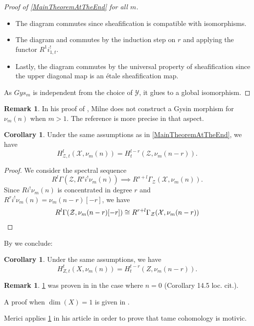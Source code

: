 \documentclass{amsart}
\theoremstyle{definition}
\newtheorem{remark}[theorem]{Remark}
\newtheorem{corollary}[theorem]{Corollary}
\newcommand{\lcirc}[1]{\scaleobj{.8}{\mbox{\Kr{#1}}}}
\numberwithin{equation}{section}
\begin{document}
\begin{proof}[Proof of \cref{MainTheoremAtTheEnd} for all $m$]
\begin{itemize}
	\item	The diagram \lcirc{{2}} commutes since sheafification is compatible with isomorphisms.
	\item The diagram and \lcirc{{3}} commutes by the induction step on $r$ and applying the functor $R^1i_{1,t}^!$.
	\item 	Lastly, the diagram \lcirc{{4}} commutes by the universal property of sheafification since the upper diagonal map is an \'etale sheafification map.
\end{itemize}    
As $Gys_m$ is independent from the choice of $\mathcal{Y}$, it glues to a global isomorphism.
\end{proof}
\begin{remark}
	In his proof of \cite[Proposition 2.1]{MilneValuesOfZeta}, Milne does not construct a Gysin morphism for $\nu_{m}(n)$ when $m>1$. The reference \cite{CohomologyLogGros} is more precise in that aspect.
\end{remark}
\renewcommand\qedsymbol{$\square$}
\begin{corollary}\label{MainResultCorollary}
	Under the same assumptions as in \cref{MainTheoremAtTheEnd}, we have
	\[
		H^l_{\mathcal{Z},t}(\mathcal{X},\nu_m(n))=H^{l-r}_t(\mathcal{Z},\nu_m(n-r)).
 \]
\end{corollary}
\begin{proof}
	We consider the spectral sequence
	\[
	R^l \Gamma (\mathcal{Z}, R^si^! \nu_m(n))\implies R^{s+l}\Gamma_{\mathcal{Z}}(\mathcal{X},\nu_m(n)).
	\]
	Since $Ri^! \nu_m(n)$ is concentrated in degree $r$ and $R^ri^!\nu_m(n)=\nu_{m}(n-r)[-r]$, we have 
	\[
	R^l \Gamma (\mathcal{Z},\nu_m(n-r)[-r]) \cong  R^{r+l}\Gamma_{\mathcal{Z}}(\mathcal{X},\nu_{m}(n-r))\qedhere
	\]
\end{proof}
By \cite[Section §14]{HSTame} we conclude:
\begin{corollary}\label{FinalSchemes}
	Under the same assumptions, we have
	\[
	H^t_{Z,t}(X,\nu_m(n))=H^{t-r}_t(Z,\nu_m(n-r)).
	\] 
\end{corollary}
\begin{remark}
	\cref{MainResultCorollary} was proven in \cite{HTame} in the case where $n=0$ (Corollary 14.5 loc. cit.). 
	
	A proof when $\dim(X)=1$ is given in \cite[Theorem 1.2.]{KatharinaPurity}.	 
	
	Merici  applies \cref{MainResultCorollary} in his article \cite{Merici} in order to prove that tame cohomology is motivic.
\end{remark}
\end{document}
